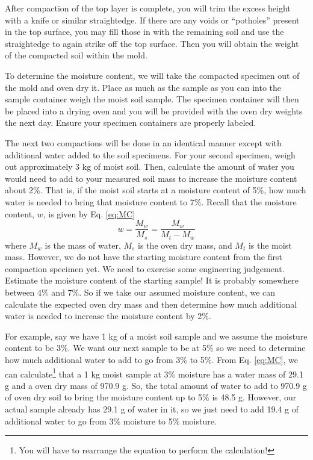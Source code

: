 \documentclass[12pt]{article}
\begin{document}
After compaction of the top layer is complete, you will trim the excess height with a knife or similar straightedge. If there are any voids or ``potholes'' present in the top surface, you may fill those in with the remaining soil and use the straightedge to again strike off the top surface. Then you will obtain the weight of the compacted soil within the mold.

To determine the moisture content, we will take the compacted specimen out of the mold and oven dry it. Place as much as the sample as you can into the sample container weigh the moist soil sample. The specimen container will then be placed into a drying oven and you will be provided with the oven dry weights the next day. Ensure your specimen containers are properly labeled.

The next two compactions will be done in an identical manner except with additional water added to the soil specimens. For your second specimen, weigh out approximately 3 kg of moist soil. Then, calculate the amount of water you would need to add to your measured soil mass to increase the moisture content about 2\%. That is, if the moist soil starts at a moisture content of 5\%, how much water is needed to bring that moisture content to 7\%. Recall that the moisture content, $w$, is given by Eq. \ref{eq:MC}
\begin{equation}
    w=\dfrac{M_w}{M_s}=\dfrac{M_w}{M_t-M_w}
    \label{eq:MC}
\end{equation}
where $M_w$ is the mass of water, $M_s$ is the oven dry mass, and $M_t$ is the moist mass. However, we do not have the starting moisture content from the first compaction specimen yet. We need to exercise some engineering judgement. Estimate the moisture content of the starting sample! It is probably somewhere between 4\% and 7\%. So if we take our assumed moisture content, we can calculate the expected oven dry mass and then determine how much additional water is needed to increase the moisture content by 2\%.

For example, say we have 1 kg of a moist soil sample and we assume the moisture content to be 3\%. We want our next sample to be at 5\% so we need to determine how much additional water to add to go from 3\% to 5\%. From Eq. \ref{eq:MC}, we can calculate\footnote{You will have to rearrange the equation to perform the calculation!} that a 1 kg moist sample at 3\% moisture has a water mass of 29.1 g and a oven dry mass of 970.9 g. So, the total amount of water to add to 970.9 g of oven dry soil to bring the moisture content up to 5\% is 48.5 g. However, our actual sample already has 29.1 g of water in it, so we just need to add 19.4 g of additional water to go from 3\% moisture to 5\% moisture.
\end{document}

